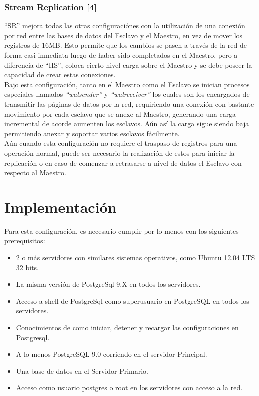 \documentclass[11pt]{article}
\begin{document}
\subsubsection{Stream Replication [4]}

``SR'' mejora todas las otras configuraci\'ones con la utilizaci\'on de una conexi\'on por red entre las bases de datos del Esclavo y el Maestro, en vez de mover los registros de 16MB. Esto permite que los cambios se pasen a trav\'es de la red de forma casi inmediata luego de haber sido completados en el Maestro, pero a diferencia de ``HS'', coloca cierto nivel carga sobre el Maestro y se debe poseer la capacidad de crear estas conexiones.\\

Bajo esta configuraci\'on, tanto en el Maestro como el Esclavo se inician procesos especiales llamados \textit{``walsender''} y \textit{``walreceiver''} los cuales son los encargados de transmitir las p\'aginas de datos por la red, requiriendo una conexi\'on con bastante movimiento por cada esclavo que se anexe al Maestro, generando una carga incremental de acorde aumenten los esclavos. A\'un as\'i la carga sigue siendo baja permitiendo anexar y soportar
varios esclavos f\'acilmente.\\

A\'un cuando esta configuraci\'on no requiere el traspaso de registros para una operaci\'on normal, puede ser necesario la realizaci\'on de estos para iniciar la replicaci\'on o en caso de comenzar a retrasarse a nivel de datos el Esclavo con respecto al Maestro.\\

\section{Implementaci\'on}
Para esta configuraci\'on, es necesario cumplir por lo menos con los siguientes prerequisitos:

\begin{itemize}
\item 2 o m\'as servidores con similares sistemas operativos, como Ubuntu 12.04 LTS 32 bits.
\item La misma versi\'on de PostgreSql 9.X en todos los servidores.
\item Acceso a shell de PostgreSql como superusuario en PostgreSQL en todos los servidores.
\item Conocimientos de como iniciar, detener y recargar las configuraciones en Postgresql.
\item A lo menos PostgreSQL 9.0 corriendo en el servidor Principal.
\item Una base de datos en el Servidor Primario.
\item Acceso como usuario postgres o root en los servidores con acceso a la red. 
\end{itemize}
\end{document}
